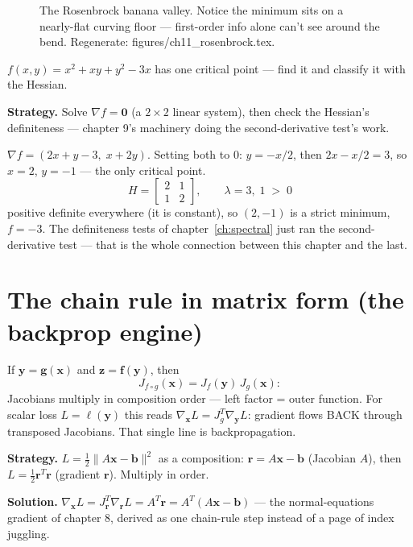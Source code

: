 \begin{figure}[htbp]
\centering

\caption{The Rosenbrock banana valley. Notice the minimum sits on a
nearly-flat curving floor --- first-order info alone can't see around
the bend. Regenerate: \ttfamily figures/ch11\_rosenbrock.tex.}
\label{fig:rosen}
\end{figure}

\begin{example}\label{ex:hessclass}
$f(x,y)=x^{2}+xy+y^{2}-3x$ has one critical point --- find it and
classify it with the Hessian.
\par\smallskip
\textbf{Strategy.} Solve $\nabla f=\mathbf 0$ (a $2\times2$ linear
system), then check the Hessian's definiteness --- chapter 9's
machinery doing the second-derivative test's work.
\begin{solution}
$\nabla f=(2x+y-3,\;x+2y)$. Setting both to 0: $y=-x/2$, then
$2x-x/2=3$, so $x=2$, $y=-1$ --- the only critical point.
\[
  H=\begin{bmatrix}2&1\\1&2\end{bmatrix},\qquad
  \lambda=3,\;1 \;>\;0
\]
positive definite everywhere (it is constant), so $(2,-1)$ is a
strict minimum, $f= -3$. The definiteness tests of
chapter~\ref{ch:spectral} just ran the second-derivative test ---
that is the whole connection between this chapter and the last.
\checkmark
\end{solution}
\end{example}

\section{The chain rule in matrix form (the backprop engine)}\label{sec:mvc-chain}

If $\mathbf y=\mathbf g(\mathbf x)$ and $\mathbf z=\mathbf f(\mathbf
y)$, then
\[
J_{f\circ g}(\mathbf x)=J_f(\mathbf y)\,J_g(\mathbf x):
\]
Jacobians multiply in composition order --- left factor = outer function.
For scalar loss $L=\ell(\mathbf y)$ this reads
$\nabla_{\mathbf x}L=J_g^{T}\nabla_{\mathbf y}L$: gradient flows BACK
through transposed Jacobians. That single line is backpropagation.

\begin{example}\label{ex:chain}
\textbf{Strategy.} $L=\tfrac12\lVert A\mathbf x-\mathbf b\rVert^{2}$ as a
composition: $\mathbf r=A\mathbf x-\mathbf b$ (Jacobian $A$), then
$L=\tfrac12\mathbf r^{T}\mathbf r$ (gradient $\mathbf r$). Multiply in
order.

\textbf{Solution.}
$\nabla_{\mathbf x}L=J_{\mathbf r}^{T}\nabla_{\mathbf r}L
=A^{T}\mathbf r=A^{T}(A\mathbf x-\mathbf b)$ --- the normal-equations
gradient of chapter 8, derived as one chain-rule step instead of a
page of index juggling.
\end{example}

